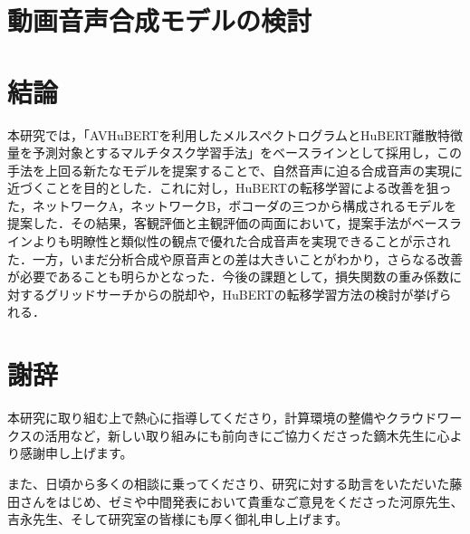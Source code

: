\documentclass[12pt]{jarticle}
\numberwithin{equation}{section}    %
\numberwithin{figure}{section}      %
\numberwithin{table}{section}      %
\begin{document}
\clearpage

\section{動画音声合成モデルの検討}





\clearpage

\section{結論}
本研究では，「AVHuBERTを利用したメルスペクトログラムとHuBERT離散特徴量を予測対象とするマルチタスク学習手法」をベースラインとして採用し，この手法を上回る新たなモデルを提案することで、自然音声に迫る合成音声の実現に近づくことを目的とした．これに対し，HuBERTの転移学習による改善を狙った，ネットワークA，ネットワークB，ボコーダの三つから構成されるモデルを提案した．その結果，客観評価と主観評価の両面において，提案手法がベースラインよりも明瞭性と類似性の観点で優れた合成音声を実現できることが示された．一方，いまだ分析合成や原音声との差は大きいことがわかり，さらなる改善が必要であることも明らかとなった．今後の課題として，損失関数の重み係数に対するグリッドサーチからの脱却や，HuBERTの転移学習方法の検討が挙げられる．

\clearpage

\section*{謝辞}
本研究に取り組む上で熱心に指導してくださり，計算環境の整備やクラウドワークスの活用など，新しい取り組みにも前向きにご協力くださった鏑木先生に心より感謝申し上げます。

また、日頃から多くの相談に乗ってくださり、研究に対する助言をいただいた藤田さんをはじめ、ゼミや中間発表において貴重なご意見をくださった河原先生、吉永先生、そして研究室の皆様にも厚く御礼申し上げます。

\clearpage



\end{document}
